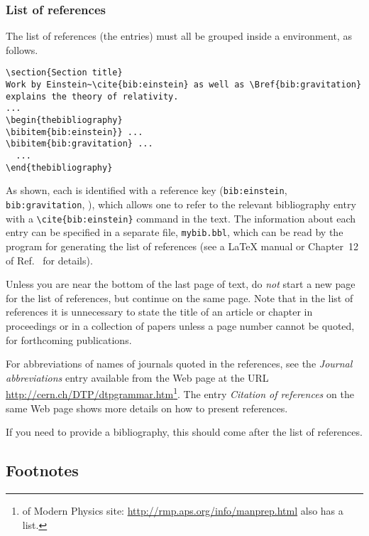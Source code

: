 \documentclass{cernyrep}
\begin{document}
\subsubsection{List of references}

The list of references (the  entries) must all be grouped
inside a  environment, as follows.

\begin{verbatim}
\section{Section title}
Work by Einstein~\cite{bib:einstein} as well as \Bref{bib:gravitation}
explains the theory of relativity.
...
\begin{thebibliography}
\bibitem{bib:einstein}} ...
\bibitem{bib:gravitation} ...
  ...
\end{thebibliography}
\end{verbatim}
As shown, each  is identified with a reference key
(\texttt{bib:einstein}, \texttt{bib:gravitation}, \etc), which allows
one to refer to the relevant bibliography entry with a
\verb|\cite{bib:einstein}| command in the text. The information about
each entry can be specified in a separate file, \eg
\texttt{mybib.bbl}, which can be read by the \BibTeX{} program for
generating the list of references (see a \LaTeX{} manual or Chapter~12
of Ref.~\cite{bib:mittelbach2004} for details).

Unless you are near the bottom of the last page of text, do \emph{not}
start a new page for the list of references, but continue on the same
page. Note that in the list of references it is unnecessary to state
the title of an article or chapter in proceedings or in a collection
of papers unless a page number cannot be quoted, \eg for forthcoming
publications.

For abbreviations of names of journals quoted in the references, see
the \emph{Journal abbreviations} entry available from the Web page at
the URL \url{http://cern.ch/DTP/dtpgrammar.htm}\footnote{%
of Modern Physics site: \url{http://rmp.aps.org/info/manprep.html}
also has a list.}. The entry \emph{Citation of references} on the same
Web page shows more details on how to present references.

If you need to provide a bibliography, this should come after the list
of references.

\subsection{Footnotes}
\end{document}
